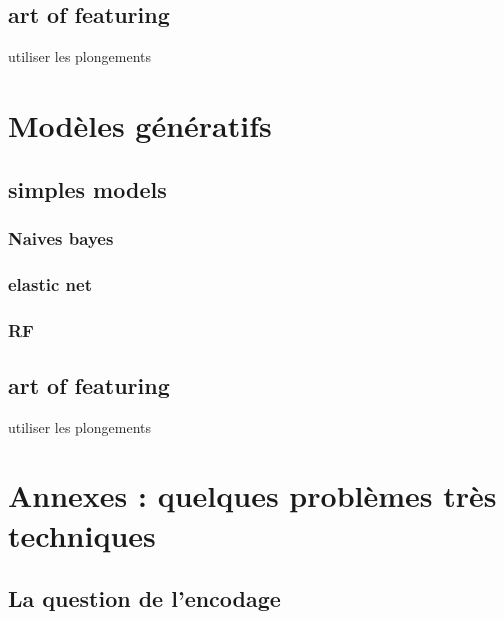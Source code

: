 \documentclass[
]{book}
\begin{document}
\hypertarget{art-of-featuring-1}{%
\section{art of featuring}\label{art-of-featuring-1}}

utiliser les plongements

\hypertarget{moduxe8les-guxe9nuxe9ratifs}{%
\chapter{Modèles génératifs}\label{moduxe8les-guxe9nuxe9ratifs}}

\hypertarget{simples-models-2}{%
\section{simples models}\label{simples-models-2}}

\hypertarget{naives-bayes-2}{%
\subsection{Naives bayes}\label{naives-bayes-2}}

\hypertarget{elastic-net-2}{%
\subsection{elastic net}\label{elastic-net-2}}

\hypertarget{rf-2}{%
\subsection{RF}\label{rf-2}}

\hypertarget{art-of-featuring-2}{%
\section{art of featuring}\label{art-of-featuring-2}}

utiliser les plongements

\hypertarget{annexes-quelques-probluxe8mes-truxe8s-techniques}{%
\chapter{Annexes : quelques problèmes très techniques}\label{annexes-quelques-probluxe8mes-truxe8s-techniques}}

\hypertarget{la-question-de-lencodage}{%
\section{La question de l'encodage}\label{la-question-de-lencodage}}
\end{document}
